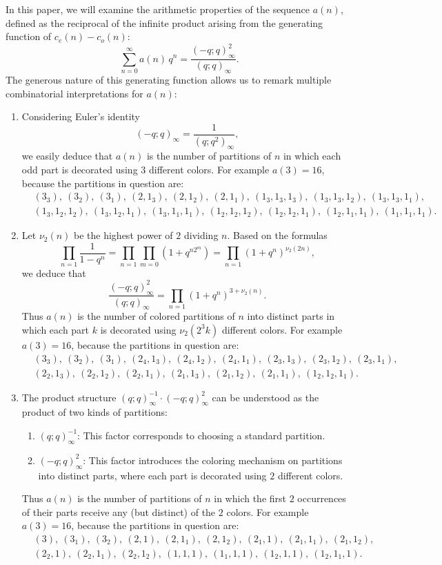\documentclass{article}
\begin{document}
In this paper, we will examine the arithmetic properties of the sequence $a(n)$, defined as the reciprocal of the infinite product arising from the generating function of $c_e(n) - c_o(n)$:
$$
\sum_{n=0}^\infty a(n)\,q^n = \frac{(-q;q)_\infty^2}{(q;q)_\infty}.
$$
The generous nature of this generating function allows us to remark multiple combinatorial interpretations for $a(n)$:
\begin{enumerate}
    \item [$\bullet$]  Considering Euler's identity
$$(-q;q)_\infty = \frac{1}{(q;q^2)_\infty},$$ we easily deduce that $a(n)$ is the number of partitions of $n$ in which each odd part is decorated using $3$ different colors. For example $a(3)=16$, because the partitions in question are:
   \begin{align*}
       & (3_3),\ (3_2),\ (3_1),\ (2,1_3),\ (2,1_2),\ (2,1_1),\ (1_3,1_3,1_3),\ (1_3,1_3,1_2),\  (1_3,1_3,1_1),\\
       & (1_3,1_2,1_2),\ (1_3,1_2,1_1),\ (1_3,1_1,1_1),\ (1_2,1_2,1_2),\ (1_2,1_2,1_1),\ (1_2,1_1,1_1),\ (1_1,1_1,1_1).
   \end{align*}
   \item [$\bullet$] Let $\nu_2(n)$ be the highest power of $2$ dividing $n$. Based on the formulas
   $$
   \prod_{n=1}\frac{1}{1-q^n} = \prod_{n=1}\prod_{m=0} (1+q^{n2^m}) = \prod_{n=1} (1+q^n)^{\nu_2(2n)},
   $$
   we deduce that
   $$
   \frac{(-q;q)_\infty^2}{(q;q)_\infty} = \prod_{n=1} (1+q^n)^{3+\nu_2(n)}.
   $$
   Thus $a(n)$ is the number of colored partitions of $n$ into distinct parts in which each part $k$ is decorated using $\nu_2(2^3k)$ different colors. For example $a(3)=16$, because the partitions in question are:
   \begin{align*}
       & (3_3),\ (3_2),\ (3_1),\ (2_4,1_3),\ (2_4,1_2),\ (2_4,1_1),\ (2_3,1_3),\ (2_3,1_2),\  (2_3,1_1),\\
       & (2_2,1_3),\ (2_2,1_2),\ (2_2,1_1),\ (2_1,1_3),\ (2_1,1_2),\ (2_1,1_1),\ (1_2,1_2,1_1).
   \end{align*}
   \item [$\bullet$] The product structure ${(q;q)^{-1}_\infty}\cdot (-q;q)^2_\infty$ can be understood as the product of two kinds of partitions:
   \begin{enumerate}
       \item [-] ${(q;q)^{-1}_\infty}$: This factor corresponds to choosing a standard partition.
       \item [-] $(-q;q)^2_\infty$: This factor introduces the coloring mechanism on partitions into distinct parts, where each part is decorated using $2$ different colors.  
   \end{enumerate}
   Thus $a(n)$ is the number of partitions of $n$ in which the first $2$ occurrences of their parts receive any (but distinct) of the $2$ colors. For example $a(3)=16$, because the partitions in question are:
   \begin{align*}
       & (3),\ (3_1),\ (3_2),\ (2,1),\ (2,1_1),\ (2,1_2),\ (2_1,1),\ (2_1,1_1),\  (2_1,1_2),\\
       & (2_2,1),\ (2_2,1_1),\ (2_2,1_2),\ (1,1,1),\ (1_1,1,1),\ (1_2,1,1),\ (1_2,1_1,1).
   \end{align*}
\end{enumerate}
\end{document}
